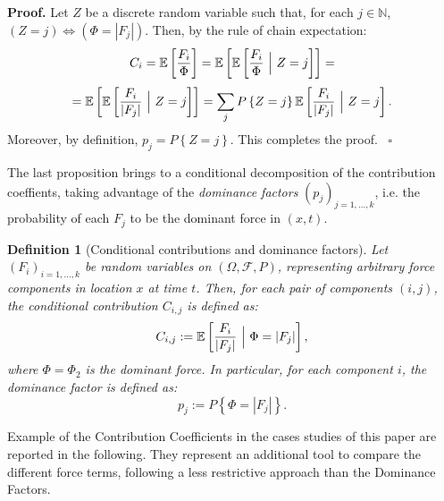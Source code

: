 \documentclass{article}
\newtheorem{definition}[theorem]{Definition}
\newenvironment{proof}[1][Proof]{\noindent\textbf{#1.} }{\ $\square$}
\begin{document}
\begin{proof}
Let $Z$ be a discrete random variable such that, for each $j\in\mathbb N$, $(Z=j) \Longleftrightarrow (\Phi=|F_j|)$. Then, by the rule of chain expectation:
$$C_i=\mathbb E\left[\frac{F_i}{\Phi}\right]=\mathbb E\left[\mathbb E\left[\frac{F_i}{\Phi}\ \Big{|}\ Z=j\right]\right]=$$
$$=\mathbb E\left[\mathbb E\left[\frac{F_i}{|F_j|}\ \Big{|}\ Z=j\right]\right]=\sum_j P\left\{Z=j\right\} \mathbb E\left[\frac{F_i}{|F_j|}\ \Big{|}\ Z=j\right].$$
Moreover, by definition, $p_j=P\left\{Z=j\right\}$. This completes the proof.
\end{proof}

The last proposition brings to a conditional decomposition of the contribution coeffients, taking advantage of the \emph{dominance factors} $(p_j)_{j=1,\dots, k}$, i.e. the probability of each $F_j$ to be the dominant force in $(x,t)$.

\begin{definition}[Conditional contributions and dominance factors]
Let $(F_i)_{i=1,\dots, k}$ be random variables on $(\Omega, \mathcal F, P)$, representing arbitrary force components in location $x$ at time $t$. Then, for each pair of components $(i,j)$, the conditional contribution $C_{i,j}$ is defined as:
$$C_{i,j}:=\mathbb E\left[\frac{F_i}{|F_j|}\ \Big{|}\ \Phi=|F_j|\right],$$
where $\Phi=\Phi_2$ is the dominant force. In particular, for each component $i$, the dominance factor is defined as:
$$p_j:=P\left\{\Phi=|F_j|\right\}.$$
\end{definition}

Example of the Contribution Coefficients in the cases studies of this paper are reported in the following. They represent an additional tool to compare the different force terms, following a less restrictive approach than the Dominance Factors.

\newpage
\end{document}
